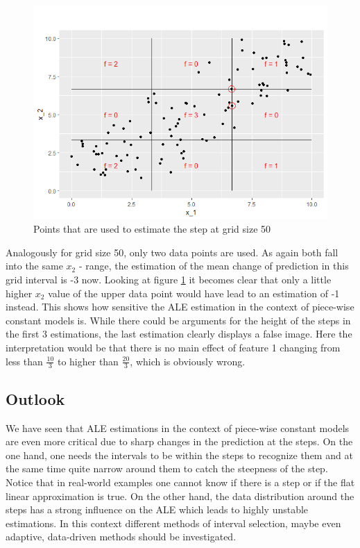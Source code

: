 \documentclass[
]{krantz}
\begin{document}
\begin{figure}
\includegraphics[width=1\linewidth]{images/ALE_2_pwc_example5_critical_points_} \caption{Points that are used to estimate the step at grid size 50}\label{fig:ALE2pwcexample5criticalpoints}
\end{figure}



Analogously for grid size 50, only two data points are used. As again both fall into the same \(x_2\) - range, the estimation of the mean change of prediction in this grid interval is -3 now. Looking at figure \ref{fig:ALE2pwcexample5criticalpoints} it becomes clear that only a little higher \(x_2\) value of the upper data point would have lead to an estimation of -1 instead. This shows how sensitive the ALE estimation in the context of piece-wise constant models is. While there could be arguments for the height of the steps in the first 3 estimations, the last estimation clearly displays a false image. Here the interpretation would be that there is no main effect of feature 1 changing from less than \(\frac{10}{3}\) to higher than \(\frac{20}{3}\), which is obviously wrong.

\hypertarget{outlook}{%
\subsection{Outlook}\label{outlook}}

We have seen that ALE estimations in the context of piece-wise constant models are even more critical due to sharp changes in the prediction at the steps. On the one hand, one needs the intervals to be within the steps to recognize them and at the same time quite narrow around them to catch the steepness of the step. Notice that in real-world examples one cannot know if there is a step or if the flat linear approximation is true. On the other hand, the data distribution around the steps has a strong influence on the ALE which leads to highly unstable estimations. In this context different methods of interval selection, maybe even adaptive, data-driven methods should be investigated.
\end{document}
